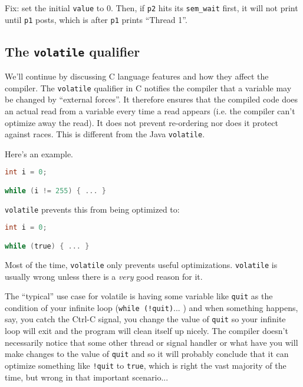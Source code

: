 Fix: set the initial {\tt value} to 0. Then, if {\tt p2} hits
its {\tt sem\_wait} first, it will not print until {\tt p1} posts, which is after 
{\tt p1} prints ``Thread 1''.


\subsection*{The {\tt volatile} qualifier}
We'll continue by discussing C language features and how they affect
the compiler. The {\tt volatile} qualifier in C notifies the compiler that
a variable may be changed by ``external forces''. It therefore ensures
that the compiled code does an actual read from a variable every time
a read appears (i.e. the compiler can't optimize away the read). It
does not prevent re-ordering nor does it protect against races. This is different from the Java {\tt volatile}.

Here's an example.
  \begin{lstlisting}[language=C]
int i = 0;

while (i != 255) { ... }
  \end{lstlisting}

{\tt volatile} prevents this from being optimized to:

  \begin{lstlisting}[language=C]
int i = 0;

while (true) { ... }
  \end{lstlisting}

Most of the time, {\tt volatile} only prevents useful
optimizations. {\tt volatile} is usually wrong unless there is a
\emph{very} good reason for it.

The ``typical'' use case for volatile is having some variable like \texttt{quit} as the condition of your infinite loop (\texttt{while (!quit)}... ) and when something happens, say, you catch the Ctrl-C signal, you change the value of \texttt{quit} so your infinite loop will exit and the program will clean itself up nicely. The compiler doesn't necessarily notice that some other thread or signal handler or what have you will make changes to the value of \texttt{quit} and so it will probably conclude that it can optimize something like \texttt{!quit} to \texttt{true}, which is right the vast majority of the time, but wrong in that important scenario...

  



